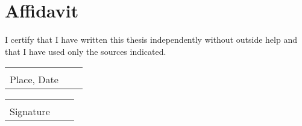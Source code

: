 %
%
\chapter*{Affidavit}
\thispagestyle{empty}

I certify that I have written this thesis independently without outside help and that I have used only the sources indicated.

\vspace{3cm}

\begin{tabular}{p{7cm}p{.5cm}l}
\hrulefill  \\
\centering Place, Date
\end{tabular}%
\hfill
\begin{tabular}{p{7cm}p{.5cm}l}
\hrulefill \\
\centering Signature
\end{tabular}%
